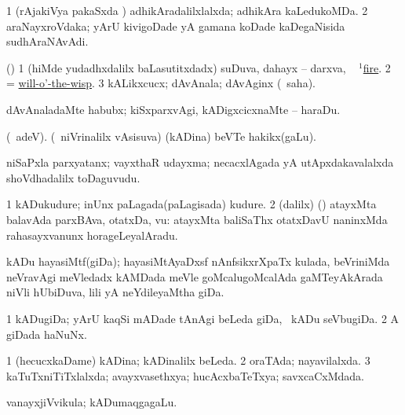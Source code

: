 \noindent
\gl{\pagu}
\expl{}
\bmng
\bnum
\num{1}  (rAjakiVya pakaSxda \vi) adhikAradalilxlalxda; adhikAra kaLedukoMDa. 
\num{2}  araNayxroVdaka; yArU kivigoDade yA gamana koDade kaDegaNisida sudhAraNAvAdi. 
\enum
\emng
\eentry

\bentry
{} 
\gl{\nA}
\expl{}
\bmng
(\ca) 
\bnum
\num{1} (hiMde yudadhxdalilx baLasutitxdadx) suDuva, dahayx -- darxva, \kanmu\  \hyperref{kandict_f.pdf}{F}{fire(1) pagu(3)}{$^1$fire}. 
\num{2} = \hyperlink{will-o'-the-wisp}{will-o'-the-wisp}. 
\num{3} kALikxcucx; dAvAnala; dAvAginx (\rUpa\ saha). 
\enum
\emng

\noindent
\gl{\pagu}
\bmng
{} dAvAnaladaMte habubx; kiSxparxvAgi, kADigxcicxnaMte -- haraDu. 
\emng
\eentry

\bentry
{} 
\gl{\nA}
\expl{}
\bmng
(\bava\ adeV). (\kanmu\ niVrinalilx vAsisuva) (kADina) beVTe hakikx(gaLu). 
\emng
\eentry

\bentry
{}
\gl{\nA}
\bmng
niSaPxla parxyatanx; vayxthaR udayxma; necacxlAgada yA utApxdakavalalxda shoVdhadalilx toDaguvudu. 
\emng
\eentry

\bentry
{} 
\gl{\nA}
\expl{}
\bmng
\bnum
\num{1} kADukudure; inUnx paLagada(paLagisada) kudure. 
\num{2} (\bava dalilx) (\AmA) atayxMta balavAda parxBAva, otatxDa, \mo vu:  atayxMta baliSaThx otatxDavU naninxMda rahasayxvanunx horageLeyalAradu. 
\enum
\emng
\eentry

\bentry
{}
\gl{\nA}
\bmng
kADu hayasiMtf(giDa); hayasiMtAyaDxsf nAnfsikxrXpaTx kulada, beVriniMda neVravAgi meVledadx kAMDada meVle goMcalugoMcalAda gaMTeyAkArada niVli hUbiDuva, lili yA neYdileyaMtha giDa. 
\emng
\eentry

\bentry
{}
\gl{\nA}
\bmng
\bnum
\num{1} kADugiDa; yArU kaqSi mADade tAnAgi beLeda giDa, \kanmu\ kADu seVbugiDa. 
\num{2} A giDada haNuNx. 
\enum
\emng
\eentry

\bentry
{}
\gl{\gu}
\bmng
\bnum
\num{1} (hecucxkaDame) kADina; kADinalilx beLeda. 
\num{2} oraTAda; nayavilalxda. 
\num{3} kaTuTxniTiTxlalxda; avayxvasethxya; hucAcxbaTeTxya; savxcaCxMdada. 
\enum
\emng
\eentry

\bentry
{} 
\gl{\nA}
\expl{}
\bmng
vanayxjiVvikula; kADumaqgagaLu. 
\emng
\eentry

